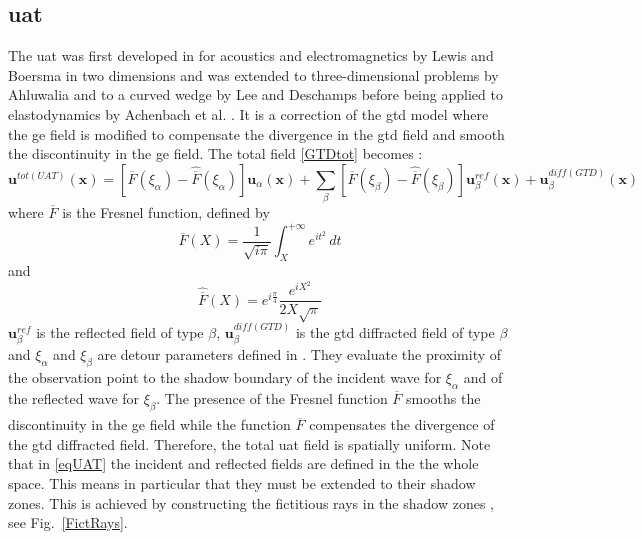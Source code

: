\subsection{\acrfull{uat}}
The \acrfull{uat} was first developed in for acoustics and electromagnetics by Lewis and Boersma \cite{Lewis} in two dimensions and was extended to three-dimensional problems by Ahluwalia \cite{Ahluwalia} and to a curved wedge by Lee and Deschamps \cite{LeeDeschamps} before being applied to elastodynamics by Achenbach et al. \cite{Achenbach}. It is a correction of the \acrshort{gtd} model where the \acrshort{ge} field is modified to compensate the divergence in the \acrshort{gtd} field and smooth the discontinuity in the \acrshort{ge} field. The total field \eqref{GTDtot} becomes :
\begin{equation}
\mathbf{u}^{tot(UAT)}(\mathbf{x})=\left[ \overline{F}(\xi_{\alpha})-\hat{\overline{F}}(\xi_{\alpha})\right]\mathbf{u}_{\alpha}(\mathbf{x})+\sum_{\beta} \left[ \overline{F}(\xi_{\beta})-\hat{\overline{F}}(\xi_{\beta})\right]\mathbf{u}^{ref}_{\beta}(\mathbf{x})+\mathbf{u}_{\beta}^{diff(GTD)}(\mathbf{x})
\label{eqUAT}
\end{equation}
where $\overline{F}$ is the Fresnel function, defined by 
\begin{equation}
\overline{F}(X)=\frac{1}{\sqrt{i\pi}}\int_X^{+\infty} e^{it^2}\,dt
\label{defFresnel}
\end{equation}
and 
\begin{equation}
\hat{\overline{F}}(X)=e^{i\frac{\pi}{4}}\dfrac{e^{iX^2}}{2X\sqrt{\pi}}
\end{equation}
$\mathbf{u}^{ref}_{\beta}$ is the reflected field of type $\beta$, $\mathbf{u}_{\beta}^{diff(GTD)}$ is the \acrshort{gtd} diffracted field of type $\beta$ and $\xi_{\alpha}$ and $\xi_{\beta}$ are detour parameters defined in \cite{LeeDeschamps}. They evaluate the proximity of the observation point to the shadow boundary of the incident wave for $\xi_{\alpha}$ and of the reflected wave for $\xi_{\beta}$. The presence of the Fresnel function $\overline{F}$ smooths the discontinuity in the \acrshort{ge} field while the function $\hat{\overline{F}}$ compensates the divergence of the \acrshort{gtd} diffracted field. Therefore, the total \acrshort{uat} field is spatially uniform. Note that in \eqref{eqUAT} the incident and reflected fields are defined in the the whole space. This means in particular that they must be extended to their shadow zones. This is achieved by constructing the fictitious rays in the shadow zones \cite{Bouche,Molinet}, see Fig.~\ref{FictRays}. 

